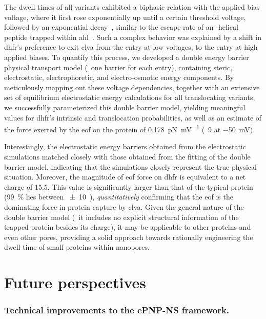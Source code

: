 The dwell times of all \DHFRt{} variants exhibited a biphasic relation with the applied bias voltage, where it
first rose exponentially up until a certain threshold voltage, followed by an exponential
decay~\cite{Biesemans-2015}, similar to the escape rate of an \ta-helical peptide trapped within
\gls{ahl}~\cite{Movileanu-2005}. Such a complex behavior was explained by a shift in \gls{dhfr}'s preference
to exit \gls{clya} from the \cisi{} entry at low voltages, to the \transi{} entry at high applied biases. To
quantify this process, we developed a double energy barrier physical transport model (\ie~one barrier for each
entry), containing steric, electrostatic, electrophoretic, and electro-osmotic energy components. By
meticulously mapping out these voltage dependencies, together with an extensive set of equilibrium
electrostatic energy calculations for all translocating \DHFRt{} variants, we successfully parameterized this
double barrier model, yielding meaningful values for \gls{dhfr}'s intrinsic \cisi{} and \transi{}
translocation probabilities, as well as an estimate of the force exerted by the \gls{eof} on the protein of
\SI{0.178}{\pico\newton\per\milli\volt} (\eg~\SI{9}{\pN} at \SI{-50}{\mV}).

Interestingly, the electrostatic energy barriers obtained from the electrostatic simulations matched closely
with those obtained from the fitting of the double barrier model, indicating that the simulations closely
represent the true physical situation. Moreover, the magnitude of \gls{eof} force on \gls{dhfr} is equivalent
to a net charge of \SI{+15.5}{\ec}. This value is significantly larger than that of the typical protein
(\SI{99}{\percent} lies between \SI{\pm10}{\ec}~\cite{Requiao-2017}), \emph{quantitatively} confirming that
the \gls{eof} is the dominating force in protein capture by \gls{clya}. Given the general nature of the double
barrier model (\ie~it includes no explicit structural information of the trapped protein besides its charge),
it may be applicable to other proteins and even other pores, providing a solid approach towards rationally
engineering the dwell time of small proteins within nanopores.



%
\section{Future perspectives}
%
\label{sec:con:perspectives}
%

\subsubsection{Technical improvements to the {ePNP-NS} framework.}
%

